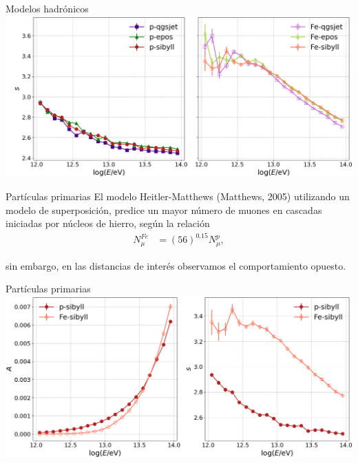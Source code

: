 \documentclass[10pt,xcolor=table]{beamer}
\begin{document}
\begin{frame}{Modelos hadr\'onicos}
\includegraphics[width=\textwidth]{Figuras/p-models_nkgs.png}
\end{frame}

\begin{frame}{Part\'iculas primarias}
El modelo Heitler-Matthews (Matthews, 2005) utilizando un modelo de superposici\'on, predice un mayor n\'umero de muones en cascadas iniciadas por n\'ucleos de hierro, seg\'un la relaci\'on
\vspace{0.5cm}
	\begin{align*}
	N_{\mu}^{Fe} &= (56)^{0.15} N_{\mu}^{p},
	\end{align*}
\vspace{0.1cm}

sin embargo, en las distancias de inter\'es observamos el comportamiento opuesto.
\end{frame}

\begin{frame}{Part\'iculas primarias}
\includegraphics[width=\textwidth]{Figuras/p-composition.png}
\end{frame}

%		
\end{document}
